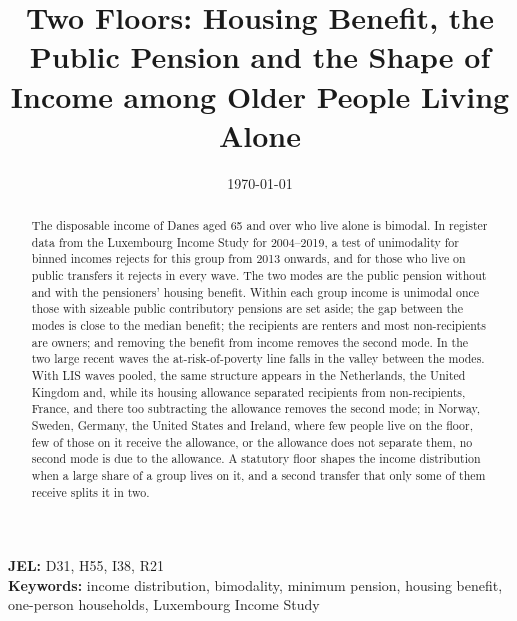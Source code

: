 \documentclass[12pt]{article}
\begin{document}
\doublespacing

\title{Two Floors: Housing Benefit, the Public Pension and the Shape of Income among Older People Living Alone}
\author{}
\date{\today}
\maketitle

\begin{abstract}
\noindent
The disposable income of Danes aged 65 and over who live alone is bimodal. In register data from the Luxembourg Income Study for 2004--2019, a test of unimodality for binned incomes rejects for this group from 2013 onwards, and for those who live on public transfers it rejects in every wave. The two modes are the public pension without and with the pensioners' housing benefit. Within each group income is unimodal once those with sizeable public contributory pensions are set aside; the gap between the modes is close to the median benefit; the recipients are renters and most non-recipients are owners; and removing the benefit from income removes the second mode. In the two large recent waves the at-risk-of-poverty line falls in the valley between the modes. With LIS waves pooled, the same structure appears in the Netherlands, the United Kingdom and, while its housing allowance separated recipients from non-recipients, France, and there too subtracting the allowance removes the second mode; in Norway, Sweden, Germany, the United States and Ireland, where few people live on the floor, few of those on it receive the allowance, or the allowance does not separate them, no second mode is due to the allowance. A statutory floor shapes the income distribution when a large share of a group lives on it, and a second transfer that only some of them receive splits it in two.
\end{abstract}

\noindent\textbf{JEL:} D31, H55, I38, R21\\
\textbf{Keywords:} income distribution, bimodality, minimum pension, housing benefit, one-person households, Luxembourg Income Study

\newpage








\newpage
\appendix

\end{document}
